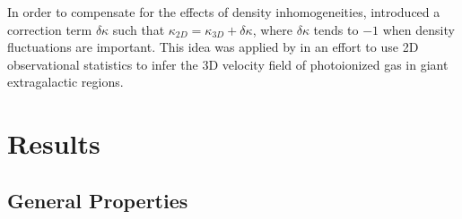 \documentclass[useAMS,usenatbib]{mn2e}
\begin{document}
In order to compensate for the effects of density inhomogeneities,
\citet {2004ApJ...604..196B} introduced a correction term $\delta\kappa$
such that $\kappa_{2D} = \kappa_{3D} + \delta\kappa$, where
$\delta\kappa$ tends to $-1$ when density fluctuations are
important. This idea was applied by \citet{2011MNRAS.413..721L}  in an
effort to use 2D observational statistics to infer the 3D velocity
field of photoionized gas in giant extragalactic \hii{} regions.

\section[]{Results}
\label{sec:results}
\subsection{General Properties}
\label{subsec:genprop}
\end{document}
